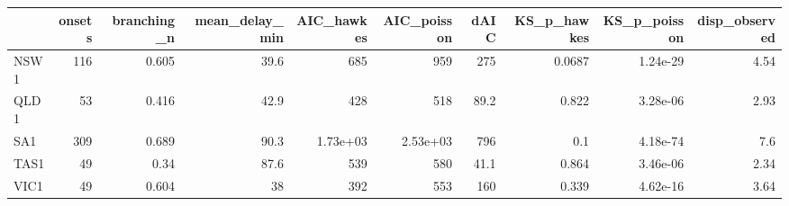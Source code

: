 \begin{tabular}{lrrrrrrrrr}
\toprule
 & onsets & branching\_n & mean\_delay\_min & AIC\_hawkes & AIC\_poisson & dAIC & KS\_p\_hawkes & KS\_p\_poisson & disp\_observed \\
\midrule
NSW1 & 116 & 0.605 & 39.6 & 685 & 959 & 275 & 0.0687 & 1.24e-29 & 4.54 \\
QLD1 & 53 & 0.416 & 42.9 & 428 & 518 & 89.2 & 0.822 & 3.28e-06 & 2.93 \\
SA1 & 309 & 0.689 & 90.3 & 1.73e+03 & 2.53e+03 & 796 & 0.1 & 4.18e-74 & 7.6 \\
TAS1 & 49 & 0.34 & 87.6 & 539 & 580 & 41.1 & 0.864 & 3.46e-06 & 2.34 \\
VIC1 & 49 & 0.604 & 38 & 392 & 553 & 160 & 0.339 & 4.62e-16 & 3.64 \\
\bottomrule
\end{tabular}